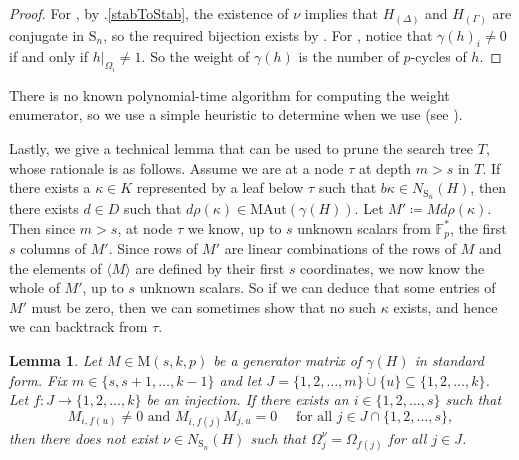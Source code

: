 \documentclass[11pt,a4paper]{article}
\newtheorem{lemma}[theorem]{Lemma}
\theoremstyle{definition}
\theoremstyle{remark}
\newcommand{\MAut}{\mathrm{MAut}}
\newcommand{\Sy}{\mathrm{S}}
\begin{document}
\begin{proof}
For , by .\ref{stabToStab}, the existence of $\nu$ implies that 
$H_{(\Delta)}$ and $H_{(\Gamma)}$ are conjugate in $\Sy_n$, so the required bijection exists by . 
For , notice that $\gamma(h)_i \neq 0$ if and only if $h|_{\Omega_i} \neq 1$. So the weight of $\gamma(h)$ is the number of $p$-cycles of $h$.
\end{proof}

There is no known polynomial-time algorithm for computing the weight enumerator, so we use a simple heuristic to determine when we use  (see ).


Lastly, we give a technical lemma that can be used to prune the search tree $T$, whose rationale is as follows. 
Assume we are at a node $\tau$ at depth $m>s$ in $T$. If there exists a $\kappa \in K$ represented by a leaf below $\tau$ such that $b \kappa \in N_{\Sy_n}(H)$, 
then there exists $d \in D$ such that $d \rho(\kappa) \in \MAut(\gamma(H))$.
Let $M' \coloneqq  M{d \rho(\kappa)}$.
Then since $m>s$, at node $\tau$ we know, up to $s$ unknown scalars from $\mathds{F}_p^*$, the first $s$ columns of $M'$. 
Since rows of $M'$ are linear combinations of the rows of $M$ and the elements of $\langle M \rangle$ are defined by their first $s$ coordinates, we now know the whole of $M'$, up to $s$ unknown scalars. So if we can deduce that some entries of $M'$ must be zero, then we can sometimes show that no such $\kappa$ exists, and hence we can backtrack from $\tau$. 

\begin{lemma} \label{deep prune lemma}
Let $M \in \mathrm{M}(s,k, p)$ be a generator matrix of $\gamma(H)$ in standard form. 
Fix $m \in \{s, s+1, \ldots,k-1\}$ and let $J = \{1, 2, \ldots, m\} \dot{\cup} \{u\} \subseteq \{1,2, \ldots, k\}$. 
Let $f: J \rightarrow \{1,2, \ldots, k\} $ be an injection.
If there exists an $i \in \{1,2, \ldots, s\}$ such that 
\begin{equation} \label{deep prune eqn}
M_{i,f(u)} \neq 0 \text{ and } M_{i, f(j) }M_{j,u}=0 \quad \text{ for all } j \in J \cap \{1,2, \ldots, s\},
\end{equation}
then there does not exist $\nu \in N_{\Sy_n}(H)$ such that $\Omega_j^\nu = \Omega_{f(j)}$ for all $j \in J$. 
\end{lemma}
\end{document}
